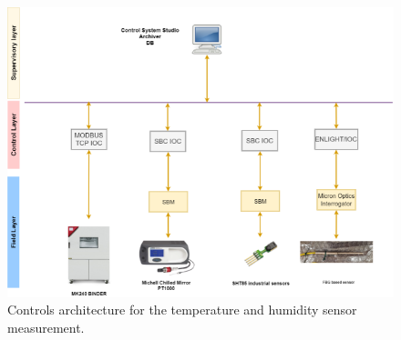 \begin{figure}[!h]
\centering
\includegraphics[width=0.75\columnwidth]{Chapter5/images/FOS_dcs_scheme.png}
\caption{Controls architecture for the temperature and humidity sensor measurement.}
\label{fig:fos_arch}
\end{figure}
